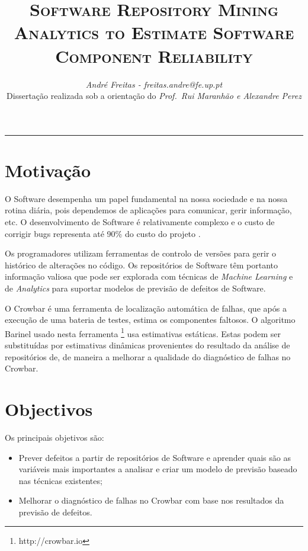 \documentclass[9pt,a4paper]{extarticle}
\begin{document}
\title{\vspace*{-8mm}\textbf{\textsc{Software Repository Mining Analytics to Estimate Software Component Reliability}}}
\author{\emph{André Freitas - freitas.andre@fe.up.pt}\\[2mm]
\small{Dissertação realizada sob a orientação do \emph{Prof.\ Rui Maranhão e Alexandre Perez}}}
\date{}
\maketitle
\thispagestyle{empty}

\vspace*{-4mm}\noindent\rule{\textwidth}{0.4pt}\vspace*{4mm}

\begin{multicols}{2}

\section{Motivação}\label{sec:motiva}
O Software desempenha um papel fundamental na nossa sociedade e na nossa rotina
diária, pois dependemos de aplicações para comunicar, gerir informação, etc.
O desenvolvimento de Software é relativamente complexo e o custo de
corrigir bugs representa até 90\% do custo do projeto \cite{Servant1}.

Os programadores utilizam ferramentas de controlo de versões para gerir o
histórico de alterações no código. Os repositórios de Software têm portanto
informação valiosa que pode ser explorada com técnicas de \emph{Machine Learning}
e de \emph{Analytics} para suportar modelos de previsão de defeitos de Software.

O Crowbar é uma ferramenta de localização automática de falhas, que após a
execução de uma bateria de testes, estima os componentes faltosos. O algoritmo
Barinel usado nesta ferramenta \footnote{http://crowbar.io} usa estimativas
estáticas. Estas podem ser substituídas por estimativas dinâmicas provenientes
do resultado da análise de repositórios de, de maneira a melhorar a qualidade do
diagnóstico de falhas no Crowbar.


\section{Objectivos}\label{sec:goals}

Os principais objetivos são:

\begin{itemize}
\item Prever defeitos a partir de repositórios de Software e aprender quais
são as variáveis mais importantes a analisar e criar um modelo de previsão
baseado nas técnicas existentes;
\item Melhorar o diagnóstico de falhas no Crowbar com base nos resultados da
previsão de defeitos.
\end{itemize}


\end{multicols}
\end{document}

